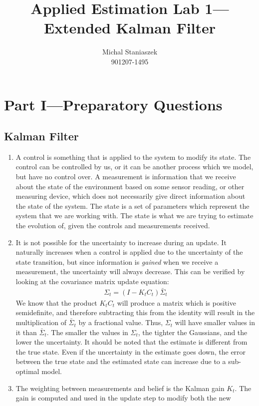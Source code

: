 \documentclass[a4paper,12pt]{article}
\title{Applied Estimation Lab 1---Extended Kalman Filter}
\author{Michal Staniaszek \\ 901207-1495}
\begin{document}
\maketitle

\section{Part I---Preparatory Questions}
\subsection{Kalman Filter}
\begin{enumerate}
\item A control is something that is applied to the system to modify its
  state. The control can be controlled by us, or it can be another process which
  we model, but have no control over. A measurement is information that we
  receive about the state of the environment based on some sensor reading, or
  other measuring device, which does not necessarily give direct information
  about the state of the system. The state is a set of parameters which
  represent the system that we are working with. The state is what we are trying
  to estimate the evolution of, given the controls and measurements received.
\item It is not possible for the uncertainty to increase during an update. It
  naturally increases when a control is applied due to the uncertainty of the
  state transition, but since information is \emph{gained} when we receive a
  measurement, the uncertainty will always decrease. This can be verified by
  looking at the covariance matrix update equation:
  \begin{align*}
    \Sigma_t=(I-K_tC_t)\bar{\Sigma}_t
  \end{align*}
  We know that the product $K_tC_t$ will produce a matrix which is positive
  semidefinite, and therefore subtracting this from the identity will result in
  the multiplication of $\bar{\Sigma}_t$ by a fractional value. Thus, $\Sigma_t$
  will have smaller values in it than $\bar{\Sigma}_t$. The smaller the values
  in $\Sigma_t$, the tighter the Gaussians, and the lower the uncertainty. It
  should be noted that the estimate is different from the true state. Even if
  the uncertainty in the estimate goes down, the error between the true
  state and the estimated state can increase due to a sub-optimal model.
\item The weighting between measurements and belief is the Kalman gain
  $K_t$. The gain is computed and used in the update step to modify both the new

\end{enumerate}
\end{document}
